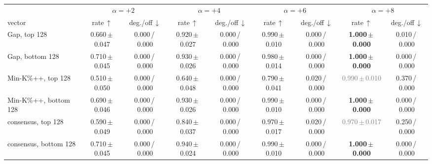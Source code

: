 \begin{tabular}{@{}lcccccccc@{}}
\toprule
& \multicolumn{2}{c}{$\alpha=+2$} & \multicolumn{2}{c}{$\alpha=+4$} & \multicolumn{2}{c}{$\alpha=+6$} & \multicolumn{2}{c}{$\alpha=+8$} \\
\cmidrule(lr){2-3}\cmidrule(lr){4-5}\cmidrule(lr){6-7}\cmidrule(lr){8-9}
vector & rate\,$\uparrow$ & deg./off\,$\downarrow$ & rate\,$\uparrow$ & deg./off\,$\downarrow$ & rate\,$\uparrow$ & deg./off\,$\downarrow$ & rate\,$\uparrow$ & deg./off\,$\downarrow$ \\
\midrule
Gap, top 128 & 0.660\,{\scriptsize$\pm$\,0.047} & {\scriptsize 0.000\,/\,0.000} & 0.920\,{\scriptsize$\pm$\,0.027} & {\scriptsize 0.000\,/\,0.000} & 0.990\,{\scriptsize$\pm$\,0.010} & {\scriptsize 0.000\,/\,0.000} & \textbf{1.000\,{\scriptsize$\pm$\,0.000}} & {\scriptsize 0.010\,/\,0.000} \\
Gap, bottom 128 & 0.710\,{\scriptsize$\pm$\,0.045} & {\scriptsize 0.000\,/\,0.000} & 0.930\,{\scriptsize$\pm$\,0.026} & {\scriptsize 0.000\,/\,0.000} & 0.980\,{\scriptsize$\pm$\,0.014} & {\scriptsize 0.000\,/\,0.000} & \textbf{1.000\,{\scriptsize$\pm$\,0.000}} & {\scriptsize 0.000\,/\,0.000} \\
Min-K\%++, top 128 & 0.510\,{\scriptsize$\pm$\,0.050} & {\scriptsize 0.000\,/\,0.000} & 0.640\,{\scriptsize$\pm$\,0.048} & {\scriptsize 0.000\,/\,0.000} & 0.790\,{\scriptsize$\pm$\,0.041} & {\scriptsize 0.020\,/\,0.000} & \textcolor{gray}{0.990\,{\scriptsize$\pm$\,0.010}} & {\scriptsize 0.370\,/\,0.000} \\
Min-K\%++, bottom 128 & 0.690\,{\scriptsize$\pm$\,0.046} & {\scriptsize 0.000\,/\,0.000} & 0.930\,{\scriptsize$\pm$\,0.026} & {\scriptsize 0.000\,/\,0.000} & 0.990\,{\scriptsize$\pm$\,0.010} & {\scriptsize 0.000\,/\,0.000} & \textbf{1.000\,{\scriptsize$\pm$\,0.000}} & {\scriptsize 0.000\,/\,0.000} \\
consensus, top 128 & 0.590\,{\scriptsize$\pm$\,0.049} & {\scriptsize 0.000\,/\,0.000} & 0.840\,{\scriptsize$\pm$\,0.037} & {\scriptsize 0.000\,/\,0.000} & 0.970\,{\scriptsize$\pm$\,0.017} & {\scriptsize 0.020\,/\,0.000} & \textcolor{gray}{0.970\,{\scriptsize$\pm$\,0.017}} & {\scriptsize 0.250\,/\,0.000} \\
consensus, bottom 128 & 0.710\,{\scriptsize$\pm$\,0.045} & {\scriptsize 0.000\,/\,0.000} & 0.940\,{\scriptsize$\pm$\,0.024} & {\scriptsize 0.000\,/\,0.000} & 0.990\,{\scriptsize$\pm$\,0.010} & {\scriptsize 0.000\,/\,0.000} & \textbf{1.000\,{\scriptsize$\pm$\,0.000}} & {\scriptsize 0.000\,/\,0.000} \\

\end{tabular}
